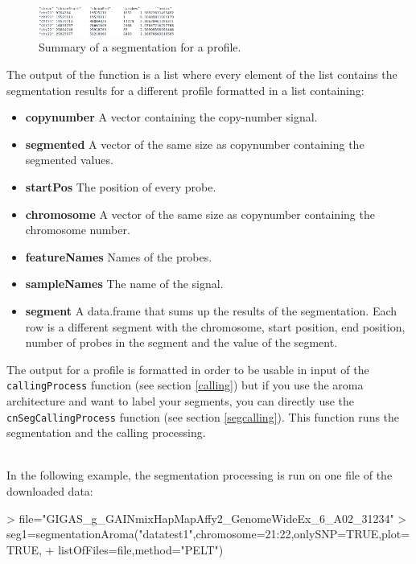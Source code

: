 \documentclass[a4paper,10pt]{article}
\begin{document}
		\begin{figure}[!h]
			\centering
			\includegraphics[width=0.4\textwidth]{fig/outbedpelt}
			\caption{Summary of a segmentation for a profile.}
			\label{outbedpelt}
		\end{figure}
		
		The output of the function is a list where every element of the list contains the segmentation results for a different profile formatted in a list containing:
		\begin{itemize}
			\item \textbf{copynumber} A vector containing  the copy-number signal.
			\item \textbf{segmented} A vector of the same size as copynumber containing the segmented values.
			\item \textbf{startPos} The position of every probe.
			\item \textbf{chromosome} A vector of the same size as copynumber containing the chromosome number.
			\item \textbf{featureNames} Names of the probes.
			\item \textbf{sampleNames} The name of the signal.
			\item \textbf{segment} A data.frame that sums up the results of the segmentation. Each row is a different segment with the chromosome, start position, end position, number of probes in the segment and the value of the segment.
		\end{itemize}
				
		The output for a profile is formatted in order to be usable in input of the \texttt{callingProcess} function (see section \ref{calling}) but if you use the aroma architecture and want to label your segments, you can directly use the \texttt{cnSegCallingProcess} function (see section \ref{segcalling}). This function runs the segmentation and the calling processing.
		
		~~\\
		
		In the following example, the segmentation processing is run on one file of the downloaded data:
		
\begin{Schunk}
\begin{Sinput}
> file="GIGAS_g_GAINmixHapMapAffy2_GenomeWideEx_6_A02_31234"
> seg1=segmentationAroma("datatest1",chromosome=21:22,onlySNP=TRUE,plot=TRUE,
+ listOfFiles=file,method="PELT")
\end{Sinput}
\end{Schunk}
		
\end{document}
